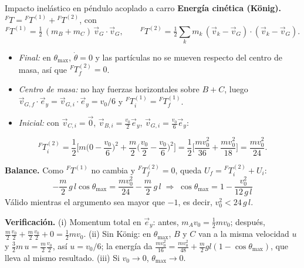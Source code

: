\begin{solucion}{Impacto inelástico en péndulo acoplado a carro}
\textbf{Energía cinética (König).} ${}^{F}T={}^{F}T^{(1)}+{}^{F}T^{(2)}$, con
$${}^{F}T^{(1)}=\tfrac12\,(m_B+m_C)\,\vec{v}_G\cdot\vec{v}_G,\qquad
{}^{F}T^{(2)}=\tfrac12\sum_k m_k\,(\vec{v}_k-\vec{v}_G)\cdot(\vec{v}_k-\vec{v}_G).$$
\begin{itemize}
  \item \emph{Final:} en $\theta_{\max}$, $\dot\theta=0$ y las partículas no se mueven respecto del centro de masa, así que ${}^{F}T_f^{(2)}=0$.
  \item \emph{Centro de masa:} no hay fuerzas horizontales sobre $B+C$, luego $\vec{v}_{G,f}\cdot\vec{e}_y=\vec{v}_{G,i}\cdot\vec{e}_y=v_0/6$ y ${}^{F}T_i^{(1)}={}^{F}T_f^{(1)}$.
  \item \emph{Inicial:} con $\vec{v}_{C,i}=\vec{0}$, $\vec{v}_{B,i}=\tfrac{v_0}{2}\vec{e}_y$, $\vec{v}_{G,i}=\tfrac{v_0}{6}\vec{e}_y$:
\end{itemize}
$${}^{F}T_i^{(2)}=\frac12\Big[m\Big(0-\frac{v_0}{6}\Big)^2+\frac m2\Big(\frac{v_0}{2}-\frac{v_0}{6}\Big)^2\Big]
=\frac12\Big[\frac{m v_0^2}{36}+\frac{m v_0^2}{18}\Big]=\frac{m v_0^2}{24}.$$
 
\textbf{Balance.} Como ${}^{F}T^{(1)}$ no cambia y ${}^{F}T_f^{(2)}=0$, queda $U_f={}^{F}T_i^{(2)}+U_i$:
$$-\frac m2\,g\,l\cos\theta_{\max}=\frac{m v_0^2}{24}-\frac m2\,g\,l
\;\Rightarrow\;
\cos\theta_{\max}=1-\frac{v_0^2}{12\,g\,l}$$
Válido mientras el argumento sea mayor que $-1$, es decir, $v_0^2<24\,g\,l$.
 
\medskip
\textbf{Verificación.} (i) Momentum total en $\vec{e}_y$: antes, $m_A v_0=\tfrac12 m v_0$; después, $\tfrac m2\tfrac{v_0}{2}+\tfrac m2\tfrac{v_0}{2}+0=\tfrac12 m v_0$. (ii) Sin König: en $\theta_{\max}$, $B$ y $C$ van a la misma velocidad $u$ y $\tfrac32 m\,u=\tfrac m2\tfrac{v_0}{2}$, así $u=v_0/6$; la energía da $\tfrac{m v_0^2}{16}=\tfrac{m v_0^2}{48}+\tfrac m2 g l(1-\cos\theta_{\max})$, que lleva al mismo resultado. (iii) Si $v_0\to0$, $\theta_{\max}\to0$.
 


\end{solucion}
